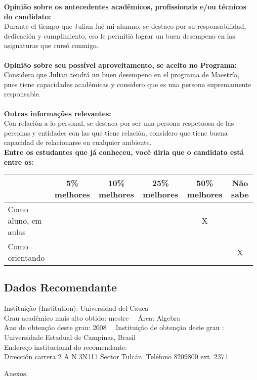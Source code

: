 \documentclass[11pt]{article}
\begin{document}
\textbf{Opinião sobre os antecedentes acadêmicos, profissionais e/ou técnicos do candidato:}
\\Durante el tiempo que Julian fué mi alumno, se destaco por su responsabilidad, dedicación y cumplimiento, eso le permitió lograr un buen desempeno en las asignaturas que cursó conmigo.\\
\\
\textbf{Opinião sobre seu possível aproveitamento, se aceito no Programa:}
\\Considero que Julian tendrá un buen desempeno en el programa de Maestría, pues tiene capacidades académicas y considero que es una persona supremamente responsable.\\ 
\\
\textbf{Outras informações relevantes:} \\Con relación a lo personal, se destaca por ser una persona respetuosa de las personas y entidades con las que tiene relación, considero que tiene buena capacidad de relacionarse en cualquier ambiente.
\\[0.3cm]
\textbf{Entre os estudantes que já conheceu, você diria que o candidato está entre os:}
\\
\begin{tabular}{|l|c|c|c|c|c|}
\hline
 & 5\% melhores & 10\% melhores & 25\% melhores & 50\% melhores & Não sabe \\
\hline
Como aluno, em aulas &  &  &  & X & \\
\hline
Como orientando &  &  &  &  & X\\
\hline
\end{tabular}
\subsection*{Dados Recomendante} 
	Instituição (Institution): Universidad del Cauca
\\ 
	Grau acadêmico mais alto obtido: mestre
	\ \ Área: Algebra
	\\
	Ano de obtenção deste grau: 2008
	\ \ 
	Instituição de obtenção deste grau : Universidade Estadual de Campinas, Brasil
	\\ 
	Endereço institucional do recomendante: \\ Dirección carrera 2 A N 3N111 Sector Tulcán.
Teléfono 8209800 ext. 2371 
\begin{center}
Anexos.
\end{center}
\end{document}
